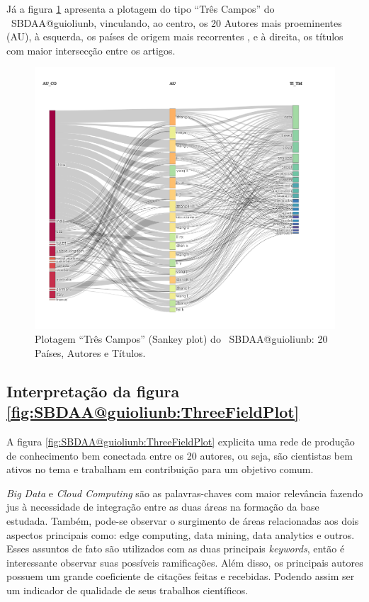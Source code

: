 Já a figura \ref{fig:SBDAA@guioliunb:ThreeFieldPlot2} apresenta a plotagem do tipo ``Três Campos'' do \dataset\   SBDAA@guioliunb, vinculando, ao centro, os 20 Autores mais proeminentes (AU), à esquerda, os países de origem mais recorrentes , e à direita, os títulos com maior intersecção entre os artigos.



\begin{figure}
    \centering
    \includegraphics[angle=0,width=1\textwidth]{experiments/guioliunb/AnaliseBibliometrica/SocialBigDataAnalysis/3FSE-countriesXauthorsXtitles.png}
    \caption{Plotagem ``Três Campos'' (Sankey plot) do \dataset\   SBDAA@guioliunb: 20 Países, Autores e Títulos.}
    \label{fig:SBDAA@guioliunb:ThreeFieldPlot2}
\end{figure}

\subsection{Interpretação da figura \ref{fig:SBDAA@guioliunb:ThreeFieldPlot}}



A figura \ref{fig:SBDAA@guioliunb:ThreeFieldPlot} explicita uma rede de produção de conhecimento bem conectada entre os 20 autores, ou seja, são cientistas bem ativos no tema e trabalham em contribuição para um objetivo comum.

\textit{Big Data} e \textit{Cloud Computing} são as palavras-chaves com maior relevância fazendo jus à necessidade de integração entre as duas áreas na formação da base estudada.
Também, pode-se observar o surgimento de áreas relacionadas aos dois aspectos principais como: edge computing, data mining, data analytics e outros. Esses assuntos de fato são utilizados com as duas principais \textit{keywords}, então é interessante observar suas possíveis ramificações.
Além disso, os principais autores possuem um grande coeficiente de citações feitas e recebidas. Podendo assim ser um indicador de qualidade de seus trabalhos científicos.

